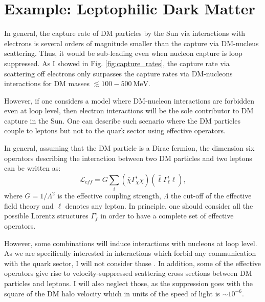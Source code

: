 \section{Example: Leptophilic Dark Matter}
\label{sec:B.3}

In general, the capture rate of DM particles by the Sun via interactions with electrons is several orders of magnitude smaller than the capture via DM-nucleus scattering. Thus, it would be sub-leading even when nucleon capture is loop suppressed. As I showed in Fig. \ref{fig:capture_rates}, the capture rate via scattering off electrons only surpasses the capture rates via DM-nucleons interactions for DM masses $\lesssim 100 - 500 \ \mathrm{MeV}$.

However, if one considers a model where DM-nucleon interactions are forbidden even at loop level, then electron interactions will be the sole contributor to DM capture in the Sun. One can describe such scenario where the DM particles couple to leptons but not to the quark sector using effective operators.

In general, assuming that the DM particle is a Dirac fermion, the dimension six operators describing the interaction between two DM particles and two leptons can be written as:
\begin{equation}\label{7.1}
	\mathcal{L}_{eff} = G \sum_{i} \left(\bar{\chi} \Gamma^{i}_{\chi} \chi\right)\left(\bar{\ell} \Gamma^{i}_{\ell} \ell\right),
\end{equation}
where $G=1/\Lambda^{2}$ is the effective coupling strength, $\Lambda$ the cut-off of the effective field theory and $\ell$ denotes any lepton. In principle, one should consider all the possible Lorentz structures $\Gamma^{i}_{f}$ in order to have a complete set of effective operators.

However, some combinations will induce interactions with nucleons at loop level. As we are specifically interested in interactions which forbid any communication with the quark sector, I will not consider those \cite{Kopp2009}. In addition, some of the effective operators give rise to velocity-suppressed scattering cross sections between DM particles and leptons. I will also neglect those, as the suppression goes with the square of the DM halo velocity which in units of the speed of light is $\sim 10^{-6}$.

